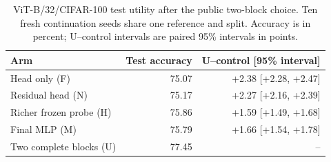 \begin{table}[t]
\centering
\caption{ViT-B/32/CIFAR-100 test utility after the public two-block choice. Ten fresh continuation seeds share one reference and split. Accuracy is in percent; U--control intervals are paired 95\% intervals in points.}
\label{tab:two_block_confirmation}
\begin{tabular}{lrr}
\toprule
Arm & Test accuracy & U--control [95\% interval] \\
\midrule
Head only (F) & 75.07 & +2.38 [+2.28, +2.47] \\
Residual head (N) & 75.17 & +2.27 [+2.16, +2.39] \\
Richer frozen probe (H) & 75.86 & +1.59 [+1.49, +1.68] \\
Final MLP (M) & 75.79 & +1.66 [+1.54, +1.78] \\
Two complete blocks (U) & 77.45 & -- \\
\bottomrule
\end{tabular}
\end{table}
